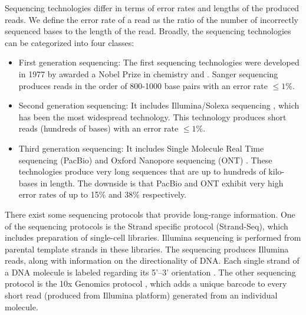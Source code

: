 Sequencing technologies differ in terms of error rates and lengths of the produced reads. We define the error rate of a read as the ratio of the number of incorrectly sequenced bases to the length of the read.
Broadly, the sequencing technologies can be categorized into four classes:
\begin{itemize}
\item First generation sequencing: The first sequencing technologies were developed in 1977 by \cite{sanger1977dna} awarded a Nobel Prize in chemistry and \cite{maxam1977new}.
Sanger sequencing produces reads in the order of 800-1000 base pairs with an error rate $\le 1$\%.
 \item Second generation sequencing: It includes Illumina/Solexa sequencing \citep{bentley2008accurate}, which has been the most widespread technology. 
 This technology produces short reads (hundreds of bases) with an error rate $\le 1$\%. 
  \item Third generation sequencing: It includes Single Molecule Real Time sequencing (PacBio) \citep{eid2009real} 
  and Oxford Nanopore sequencing (ONT) \citep{laszlo2014decoding}. These technologies produce very long sequences that are up to hundreds of kilo-bases in length. 
  The downside is that PacBio and ONT exhibit very high error rates of up to 15\% and 38\% respectively. 
\end{itemize}

There exist some sequencing protocols that provide long-range information.
One of the sequencing protocols is the Strand specific protocol (Strand-Seq), which includes preparation of single-cell libraries. 
Illumina sequencing is performed from parental template strands in these libraries. The sequencing produces Illumina reads, along with information on the directionality of DNA. 
Each single strand of a DNA molecule is labeled regarding its 5'–3' orientation \citep{falconer2012dna}.
The other sequencing protocol is the 10x Genomics protocol \citep{eisenstein2015startups}, which adds a unique barcode to every short read (produced from Illumina platform) generated from an individual molecule.

